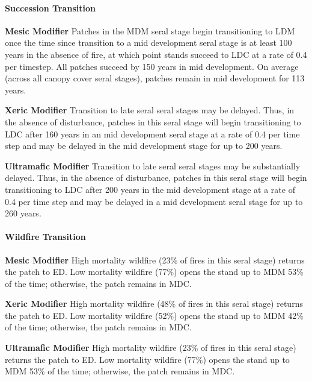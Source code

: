 \paragraph{Succession Transition}
\begin{adjustwidth}{2cm}{}
\textbf{Mesic Modifier }  Patches in the MDM seral stage begin transitioning to LDM once the time since transition to a mid development seral stage is at least 100 years in the absence of fire, at which point stands succeed to LDC at a rate of 0.4 per timestep. All patches succeed by 150 years in mid development. On average (across all canopy cover seral stages), patches remain in mid development for 113 years.

\medskip
\noindent \textbf{Xeric Modifier}  Transition to late seral seral stages may be delayed. Thus, in the absence of disturbance, patches in this seral stage will begin transitioning to LDC after 160 years in an mid development seral stage at a rate of 0.4 per time step and may be delayed in the mid development stage for up to 200 years. 

\medskip
\noindent \textbf{Ultramafic Modifier} Transition to late seral seral stages may be substantially delayed. Thus, in the absence of disturbance, patches in this seral stage will begin transitioning to LDC after 200 years in the mid development stage at a rate of 0.4 per time step and may be delayed in a mid development seral stage for up to 260 years.

\end{adjustwidth}

\paragraph{Wildfire Transition}
\begin{adjustwidth}{2cm}{}
\textbf{Mesic Modifier } High mortality wildfire (23\% of fires in this seral stage) returns the patch to ED. Low mortality wildfire (77\%) opens the stand up to MDM 53\% of the time; otherwise, the patch remains in MDC. 

\medskip
\noindent \textbf{Xeric Modifier} High mortality wildfire (48\% of fires in this seral stage) returns the patch to ED. Low mortality wildfire (52\%) opens the stand up to MDM 42\% of the time; otherwise, the patch remains in MDC.

\medskip
\noindent \textbf{Ultramafic Modifier} High mortality wildfire (23\% of fires in this seral stage) returns the patch to ED. Low mortality wildfire (77\%) opens the stand up to MDM 53\% of the time; otherwise, the patch remains in MDC.

\end{adjustwidth}

